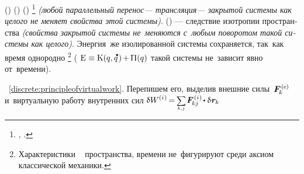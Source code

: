 \begin{otherlanguage}{russian}

\vspace{-0.3em}
()
()
()%
\footnote{%
\emph{ }
\ru{,}
,
.%
}\hspace{-0.25ex}
%
\emph{(любой параллельный перенос\:--- трансляция\:--- закрытой системы как целого не меняет свойства этой системы)}.
%
()
\:---
следствие изотропии пространства
\emph{(свойства закрытой системы не~меняются с~любым поворотом такой системы как целого)}.
%
Энергия~же
изолированной системы
сохраняется,
так~как
время однородно%
%
\footnote{%
Характеристики
~
пространства,
времени
не~фигурируют среди аксиом
классической механики.
}\hspace{-0.25ex} %
(
${\mathrm{E} \hspace{.1ex} \equiv \kineticenergyinmechanics \hspace{.1ex} (q, \mathdotabove{q} \hspace{.2ex}) \hspace{-0.2ex} + \hspace{-0.1ex} \potentialenergyinmechanics (q)}$
такой системы
не~зависит явно от~времени).

~\eqref{discrete:principleofvirtualwork}.
Перепишем его,
выделив
внешние силы~${\bm{F}^{\smthexternal}_{\hspace{-0.16ex}k}}$
и~виртуальную работу
внутренних сил
${\variation{\internalwork} \hspace{-0.1ex} = \hspace{-0.2ex} \scalebox{.8}{$ \displaystyle \underset{\raisemath{.25ex}{\smash{k,\hspace{.1ex}j}}}{\sum} $} \hspace{.2ex} \bm{F}^{\smthinternal}_{\hspace{-0.16ex}kj} \hspace{-0.1ex} \dotp \variation{\hspace{.1ex}\locationvector_{\hspace{-0.1ex}k}} \hspace{.1ex}}$


\end{otherlanguage}
